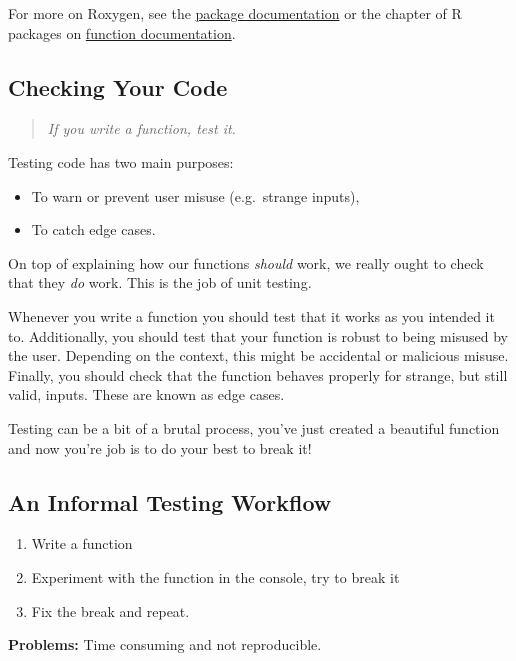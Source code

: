 \documentclass[
  letterpaper,
  DIV=11,
  numbers=noendperiod]{scrreprt}
\providecommand{\tightlist}{%
  \setlength{\itemsep}{0pt}\setlength{\parskip}{0pt}}\usepackage{longtable,booktabs,array}
\begin{document}
For more on Roxygen, see the \href{https://roxygen2.r-lib.org/}{package
documentation} or the chapter of R packages on
\href{https://r-pkgs.org/man.html}{function documentation}.

\subsection{Checking Your Code}\label{checking-your-code}

\begin{quote}
\emph{If you write a function, test it.}
\end{quote}

Testing code has two main purposes:

\begin{itemize}
\tightlist
\item
  To warn or prevent user misuse (e.g.~strange inputs),
\item
  To catch edge cases.
\end{itemize}

On top of explaining how our functions \emph{should} work, we really
ought to check that they \emph{do} work. This is the job of unit
testing.

Whenever you write a function you should test that it works as you
intended it to. Additionally, you should test that your function is
robust to being misused by the user. Depending on the context, this
might be accidental or malicious misuse. Finally, you should check that
the function behaves properly for strange, but still valid, inputs.
These are known as edge cases.

Testing can be a bit of a brutal process, you've just created a
beautiful function and now you're job is to do your best to break it!

\subsection{An Informal Testing
Workflow}\label{an-informal-testing-workflow}

\begin{enumerate}
\def\labelenumi{\arabic{enumi}.}
\tightlist
\item
  Write a function
\item
  Experiment with the function in the console, try to break it
\item
  Fix the break and repeat.
\end{enumerate}

\textbf{Problems:} Time consuming and not reproducible.
\end{document}
